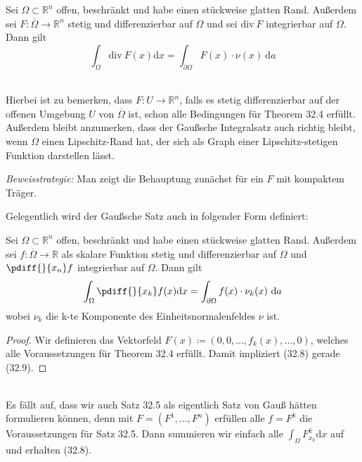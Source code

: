 \begin{theorem}
Sei $\Omega\subset\mathbb{R}^n$ offen, beschränkt und habe 
einen stückweise glatten Rand. Außerdem sei $F:\overline{\Omega} 
\rightarrow\mathbb{R}^n$ stetig und differenzierbar auf $\Omega$ und sei $\mathrm{div\ }F$ integrierbar auf $\Omega$. 
Dann gilt
\begin{equation}
	\int_\Omega\mathrm{div\ }F(x)\mathrm{d}x = 
	\int_{\partial\Omega}F(x)\cdot\nu(x)\ \mathrm{d}a
\end{equation}
\end{theorem}
\ \\
Hierbei ist zu bemerken, dass $F:U\rightarrow\mathbb{R}^n$, 
falls es stetig differenzierbar auf der offenen Umgebung $U$ 
von $\overline{\Omega}$ ist, schon alle Bedingungen für 
Theorem 32.4 erfüllt. \\
Außerdem bleibt anzumerken, dass der Gaußsche Integralsatz 
auch richtig bleibt, wenn $\Omega$ einen Lipschitz-Rand hat, 
der sich als Graph einer Lipschitz-stetigen Funktion 
darstellen lässt.\\
\linebreak

\emph{Beweisstrategie:} Man zeigt die Behauptung zunächst 
für ein $F$ mit kompaktem Träger.\\
\linebreak

Gelegentlich wird der Gaußsche Satz auch in folgender Form definiert:

\begin{satz}
Sei $\Omega\subset\mathbb{R}^n$ offen, beschränkt und habe 
einen stückweise glatten Rand. Außerdem sei $f:\overline{\Omega}\rightarrow\mathbb{R}$ als skalare 
Funktion stetig und differenzierbar auf $\Omega$ und 
$\pdiff{}{x_n}f$ integrierbar auf $\Omega$. 
Dann gilt
\begin{equation}
	\int_\Omega\pdiff{}{x_k}f(x)\mathrm{d}x = 
	\int_{\partial\Omega}f(x)\cdot\nu_k(x)\ \mathrm{d}a
\end{equation}
wobei $\nu_k$ die k-te Komponente des Einheitsnormalenfeldes 
$\nu$ ist.
\end{satz}

\begin{proof}
Wir definieren das Vektorfeld $F(x)\coloneqq 
(0,0,. . .,f_k(x),. . .,0)$, welches alle Voraussetzungen 
für Theorem 32.4 erfüllt. Damit impliziert (32.8) gerade 
(32.9).
\end{proof}
\ \\
Es fällt auf, dass wir auch Satz 32.5 als eigentlich Satz 
von Gauß hätten formulieren können, denn mit $F = 
(F^1,...,F^n)$ erfüllen alle $f=F^k$ die Voraussetzungen 
für Satz 32.5. Dann summieren wir einfach alle $\int_\Omega F_{x_k}^k\mathrm{d}x$ auf und erhalten (32.8).

